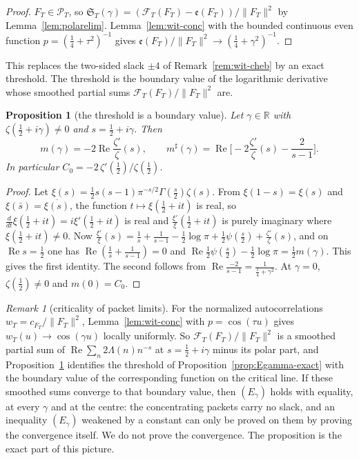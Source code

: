 \documentclass[11pt]{amsart}
\newtheorem{proposition}[theorem]{Proposition}
\theoremstyle{definition}
\theoremstyle{remark}
\newtheorem{remark}[theorem]{Remark}
\newcommand{\R}{\mathbb R}
\newcommand{\Rel}{\operatorname{Re}}
\newcommand{\PT}{\mathcal P_T}
\begin{document}
\begin{proof}
$F_T\in\PT$, so $\mathfrak S_T(\gamma)=(\mathcal F_T(F_T)-\mathfrak e(F_T))/\|F_T\|^2$ by Lemma~\ref{lem:polarelim}. Lemma~\ref{lem:wit-conc}
with the bounded continuous even function $p=(\frac14+\tau^2)^{-1}$ gives $\mathfrak e(F_T)/\|F_T\|^2\to(\frac14+\gamma^2)^{-1}$.
\end{proof}

This replaces the two-sided slack $\pm4$ of Remark~\ref{rem:wit-cheb} by an exact threshold. The threshold is the
boundary value of the logarithmic derivative whose smoothed partial sums $\mathcal F_T(F_T)/\|F_T\|^2$ are.

\begin{proposition}[the threshold is a boundary value]\label{prop:boundary}
Let $\gamma\in\R$ with $\zeta(\frac12+i\gamma)\ne0$ and $s=\frac12+i\gamma$. Then
\[
m(\gamma)=-2\Rel\frac{\zeta'}{\zeta}(s),\qquad m^\sharp(\gamma)=\Rel\Big[-2\frac{\zeta'}{\zeta}(s)-\frac2{s-1}\Big].
\]
In particular $C_0=-2\,\zeta'(\frac12)/\zeta(\frac12)$.
\end{proposition}

\begin{proof}
Let $\xi(s)=\frac12s(s-1)\pi^{-s/2}\Gamma(\frac s2)\zeta(s)$. From $\xi(1-s)=\xi(s)$ and $\xi(\bar s)=\overline{\xi(s)}$, the function
$t\mapsto\xi(\frac12+it)$ is real, so $\frac{d}{dt}\xi(\frac12+it)=i\xi'(\frac12+it)$ is real and $\frac{\xi'}{\xi}(\frac12+it)$ is purely
imaginary where $\xi(\frac12+it)\ne0$. Now $\frac{\xi'}{\xi}(s)=\frac1s+\frac1{s-1}-\frac12\log\pi+\frac12\psi(\frac s2)+\frac{\zeta'}{\zeta}(s)$, and on
$\Rel s=\frac12$ one has $\Rel(\frac1s+\frac1{s-1})=0$ and $\Rel\frac12\psi(\frac s2)-\frac12\log\pi=\frac12m(\gamma)$. This gives the first
identity. The second follows from $\Rel\frac{-2}{s-1}=\frac1{\frac14+\gamma^2}$. At $\gamma=0$, $\zeta(\frac12)\ne0$ and $m(0)=C_0$.
\end{proof}

\begin{remark}[criticality of packet limits]\label{rem:critical}
For the normalized autocorrelations $w_T=c_{F_T}/\|F_T\|^2$, Lemma~\ref{lem:wit-conc} with $p=\cos(\tau u)$ gives $w_T(u)\to\cos(\gamma u)$
locally uniformly. So $\mathcal F_T(F_T)/\|F_T\|^2$ is a smoothed partial sum of $\Rel\sum_n2\Lambda(n)n^{-s}$ at
$s=\frac12+i\gamma$ minus its polar part, and Proposition~\ref{prop:boundary} identifies the threshold of
Proposition~\ref{prop:Egamma-exact} with the boundary value of the corresponding function on the critical line. If these
smoothed sums converge to that boundary value, then $(E_\gamma)$ holds with equality, at every $\gamma$ and at the
centre: the concentrating packets carry no slack, and an inequality $(E_\gamma)$ weakened by a constant can only be
proved on them by proving the convergence itself. We do not prove the convergence. The proposition is the exact part
of this picture.
\end{remark}
\end{document}
